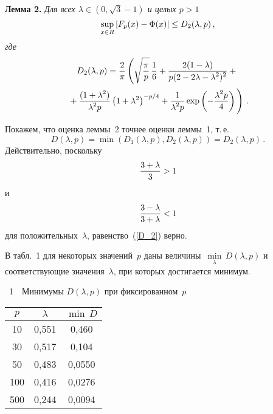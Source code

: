 \begin{multicols}{2}
\smallskip

\noindent
\textbf{Лемма 2.} %
\textit{Для всех $\lambda \in (0,\sqrt{3}-1)$ и целых $p >1$}
\begin{equation*}
\sup\limits_{x \in R} |F_p(x) - \mbox{$\Phi$}(x)| \le D_2(\lambda,p)\,,
\end{equation*}
\textit{где}
\begin{multline*}
D_2(\lambda, p) =\fr{2}{\pi} \left( \sqrt{\fr{\pi}{p}}\,\fr{1}{6}
 +\fr{ 2 (1-\lambda)}{p(2-2\lambda-\lambda^2)^2}+ {}\right.\\
\left. {}+
 \fr{(1+
\lambda^2)}{\lambda^2 p} \left(1+\lambda^2\right)^{-p/4}
  + \fr{1}{\lambda^2 p} \exp \left(-\fr{\lambda^2 p}{4}\right)
  \vphantom{\sqrt{\fr{\pi}{p}}}
  \right)\,.
\end{multline*}

\smallskip

Покажем, что оценка леммы~2 точнее оценки леммы~1, т.\,е.\
\begin{equation}
D(\lambda,p) = \min\left(D_1(\lambda,p), D_2(\lambda,p)\right) = D_2(\lambda,p)\,.
 \label{D_2}
\end{equation}
Действительно, поскольку 
$$
\displaystyle\frac{\displaystyle 3+\lambda\mathstrut}{\displaystyle 3\mathstrut} > 1
$$ и 
$$
\displaystyle\frac{\displaystyle 3-\lambda\mathstrut}{\displaystyle 3+\lambda\mathstrut} < 1
$$ 
для положительных~$\lambda$, равенство~(\ref{D_2}) верно.

В табл.~1 для некоторых значений~$p$ даны величины~$\underset{\lambda}{\min}\, D(\lambda,p)$ 
и соответствующие значения~$\lambda$, при которых достигается минимум.

\bigskip

\begin{center} %
\noindent
\parbox{59mm}{{\tablename~1}\ \ \small{Минимумы $D(\lambda,p)$ при фиксированном~$p$}}
\end{center}

{\small
\begin{center}
\tabcolsep=16pt
\begin{tabular}{|c|c|c|}
\hline
$p$ & $\lambda$ &$\min\, D$\\
\hline
 10 & 0,551 & 0,460\hphantom{9}\\
 30  &  0,517 & 0,104\hphantom{9}\\
 50  &  0,483 & 0,0550\\
 100\hphantom{9} & 0,416 & 0,0276\\
 500\hphantom{9}  & 0,244 & 0,0094\\
\hline
\end{tabular}
\end{center}
}



\end{multicols}
